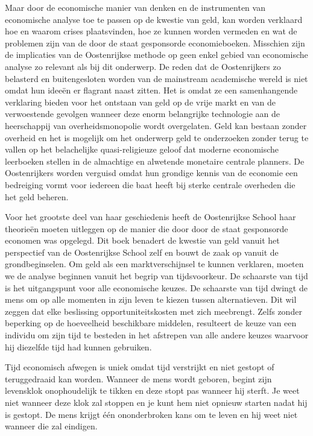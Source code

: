 Maar door de economische manier van denken en de instrumenten van economische analyse toe te passen op de kwestie van geld, kan worden verklaard hoe en waarom crises plaatsvinden, hoe ze kunnen worden vermeden en wat de problemen zijn van de door de staat gesponsorde economieboeken. Misschien zijn de implicaties van de Oostenrijkse methode op geen enkel gebied van economische analyse zo relevant als bij dit onderwerp. De reden dat de Oostenrijkers zo belasterd en buitengesloten worden van de mainstream academische wereld is niet omdat hun ideeën er flagrant naast zitten. Het is omdat ze een samenhangende verklaring bieden voor het ontstaan van geld op de vrije markt en van de verwoestende gevolgen wanneer deze enorm belangrijke technologie aan de heerschappij van overheidsmonopolie wordt overgelaten. Geld kan bestaan zonder overheid en het is mogelijk om het onderwerp geld te onderzoeken zonder terug te vallen op het belachelijke quasi-religieuze geloof dat moderne economische leerboeken stellen in de almachtige en alwetende monetaire centrale planners. De Oostenrijkers worden verguisd omdat hun grondige kennis van de economie een bedreiging vormt voor iedereen die baat heeft bij sterke centrale overheden die het geld beheren.

Voor het grootste deel van haar geschiedenis heeft de Oostenrijkse School haar theorieën moeten uitleggen op de manier die door door de staat gesponsorde economen was opgelegd. Dit boek benadert de kwestie van geld vanuit het perspectief van de Oostenrijkse School zelf en bouwt de zaak op vanuit de grondbeginselen. Om geld als een marktverschijnsel te kunnen verklaren, moeten we de analyse beginnen vanuit het begrip van tijdsvoorkeur. De schaarste van tijd is het uitgangspunt voor alle economische keuzes. De schaarste van tijd dwingt de mens om op alle momenten in zijn leven te kiezen tussen alternatieven. Dit wil zeggen dat elke beslissing opportuniteitskosten met zich meebrengt. Zelfs zonder beperking op de hoeveelheid beschikbare middelen, resulteert de keuze van een individu om zijn tijd te besteden in het afstrepen van alle andere keuzes waarvoor hij diezelfde tijd had kunnen gebruiken.

Tijd economisch afwegen is uniek omdat tijd verstrijkt en niet gestopt of teruggedraaid kan worden. Wanneer de mens wordt geboren, begint zijn levensklok onophoudelijk te tikken en deze stopt pas wanneer hij sterft. Je weet niet wanneer deze klok zal stoppen en je kunt hem niet opnieuw starten nadat hij is gestopt. De mens krijgt één ononderbroken kans om te leven en hij weet niet wanneer die zal eindigen.


